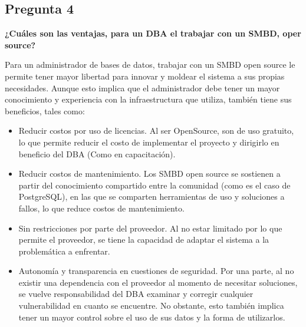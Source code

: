 \subsection*{Pregunta 4}
\textbf{¿Cuáles son las ventajas, para un DBA el trabajar con un SMBD, oper source?}

Para un administrador de bases de datos, trabajar con un SMBD open source le permite tener mayor libertad para innovar y moldear el sistema a sus propias necesidades. Aunque esto implica que el administrador debe tener un mayor conocimiento y experiencia con la infraestructura que utiliza, también tiene sus beneficios, tales como:
\begin{itemize}
    \item Reducir costos por uso de licencias. Al ser OpenSource, son de uso gratuito, lo que permite reducir el costo de implementar el proyecto y dirigirlo en beneficio del DBA (Como en capacitación).
    \item Reducir costos de mantenimiento. Los SMBD open source se sostienen a partir del conocimiento compartido entre la comunidad  (como es el caso de PostgreSQL), en las que se comparten herramientas de uso y soluciones a fallos, lo que reduce costos de mantenimiento.
    \item Sin restricciones por parte del proveedor. Al no estar limitado por lo que permite el proveedor, se tiene la capacidad de adaptar el sistema a la problemática a enfrentar. 
    \item Autonomía y transparencia en cuestiones de seguridad. Por una parte, al no existir una dependencia con el proveedor al momento de necesitar soluciones, se vuelve responsabilidad del DBA examinar y corregir cualquier vulnerabilidad en cuanto se encuentre. No obstante, esto también implica tener un mayor control sobre el uso de sus datos y la forma de utilizarlos.
\end{itemize}
\newpage
